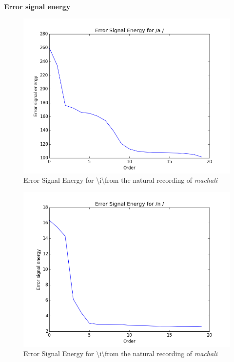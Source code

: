 \documentclass[a4paper]{article}
\begin{document}
\newpage

\textbf{Error signal energy}

\begin{figure}[h!]
    \includegraphics[width=\linewidth]{./images/error_energy_a.png}
    \caption{Error Signal Energy for \textbackslash i\textbackslash from the natural recording of \textit{machali}}
    \label{fig:1}
\end{figure}


\begin{figure}[h!]
    \includegraphics[width=\linewidth]{./images/error_energy_n.png}
    \caption{Error Signal Energy for \textbackslash i\textbackslash from the natural recording of \textit{machali}}
    \label{fig:1}
\end{figure}
\end{document}
